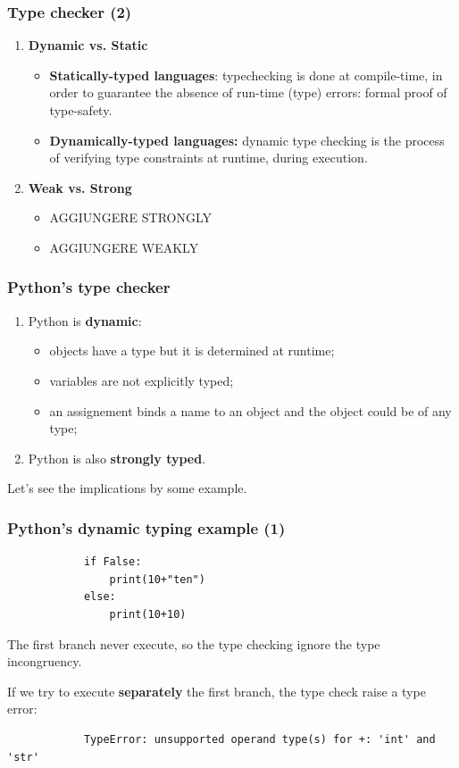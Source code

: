 \documentclass[xcolor ={table,usenames,dvipsnames}]{beamer}
\theoremstyle{definition}
\begin{document}
	\begin{frame}
		\frametitle{Type checker (2) }
		\begin{enumerate}
			\item \textbf{Dynamic vs. Static}\begin{itemize}
				\item \textbf{Statically-typed languages}: typechecking is done at
				compile-time, in order to guarantee the absence of run-time (type) errors:
				formal proof of type-safety.
				\item \textbf{Dynamically-typed languages:} dynamic
				type checking is the process of verifying type constraints at runtime,
				during execution.
			\end{itemize}
			\item \textbf{Weak vs. Strong}\begin{itemize}
				\item AGGIUNGERE STRONGLY
				\item AGGIUNGERE WEAKLY	
			\end{itemize}
		\end{enumerate}
	\end{frame}

	\begin{frame}
		\frametitle{Python's type checker}
			\begin{enumerate}
				\item Python is \textbf{dynamic}: 
				\begin{itemize}
					\item objects have a type but it is determined at runtime;
					\item variables are not explicitly typed;
					\item an assignement binds a name to an object and the object could be of any type;
				\end{itemize}
				\item Python is also \textbf{strongly typed}.
			\end{enumerate}
			Let's see the implications by some example.
	\end{frame}

	\begin{frame}[fragile]
		\frametitle{Python's dynamic typing example (1)}
			\begin{lstlisting} 
			if False:
				print(10+"ten") 
			else:
				print(10+10)
			\end{lstlisting}
			The first branch never execute, so the type checking ignore the type incongruency.
			
			If we try to execute \textbf{separately} the first branch, the type check raise a type error:
			
			\begin{lstlisting}
			TypeError: unsupported operand type(s) for +: 'int' and 'str'
			\end{lstlisting}
	\end{frame}
\end{document}
